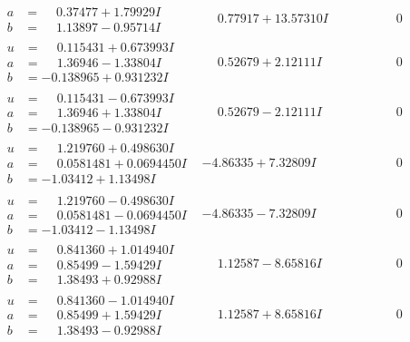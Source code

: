 \documentclass[1p]{elsarticle_modified}
\theoremstyle{definition}
\begin{document}
$$\begin{array}{c|c|c}
\begin{aligned}
a &= \phantom{-}0.37477 + 1.79929 I \\
b &= \phantom{-}1.13897 - 0.95714 I\end{aligned}
 & \phantom{-}0.77917 + 13.57310 I & \phantom{-0.000000 } 0 \\ \hline\begin{aligned}
u &= \phantom{-}0.115431 + 0.673993 I \\
a &= \phantom{-}1.36946 - 1.33804 I \\
b &= -0.138965 + 0.931232 I\end{aligned}
 & \phantom{-}0.52679 + 2.12111 I & \phantom{-0.000000 } 0 \\ \hline\begin{aligned}
u &= \phantom{-}0.115431 - 0.673993 I \\
a &= \phantom{-}1.36946 + 1.33804 I \\
b &= -0.138965 - 0.931232 I\end{aligned}
 & \phantom{-}0.52679 - 2.12111 I & \phantom{-0.000000 } 0 \\ \hline\begin{aligned}
u &= \phantom{-}1.219760 + 0.498630 I \\
a &= \phantom{-}0.0581481 + 0.0694450 I \\
b &= -1.03412 + 1.13498 I\end{aligned}
 & -4.86335 + 7.32809 I & \phantom{-0.000000 } 0 \\ \hline\begin{aligned}
u &= \phantom{-}1.219760 - 0.498630 I \\
a &= \phantom{-}0.0581481 - 0.0694450 I \\
b &= -1.03412 - 1.13498 I\end{aligned}
 & -4.86335 - 7.32809 I & \phantom{-0.000000 } 0 \\ \hline\begin{aligned}
u &= \phantom{-}0.841360 + 1.014940 I \\
a &= \phantom{-}0.85499 - 1.59429 I \\
b &= \phantom{-}1.38493 + 0.92988 I\end{aligned}
 & \phantom{-}1.12587 - 8.65816 I & \phantom{-0.000000 } 0 \\ \hline\begin{aligned}
u &= \phantom{-}0.841360 - 1.014940 I \\
a &= \phantom{-}0.85499 + 1.59429 I \\
b &= \phantom{-}1.38493 - 0.92988 I\end{aligned}
 & \phantom{-}1.12587 + 8.65816 I & \phantom{-0.000000 } 0\\

\end{array}$$
\end{document}
